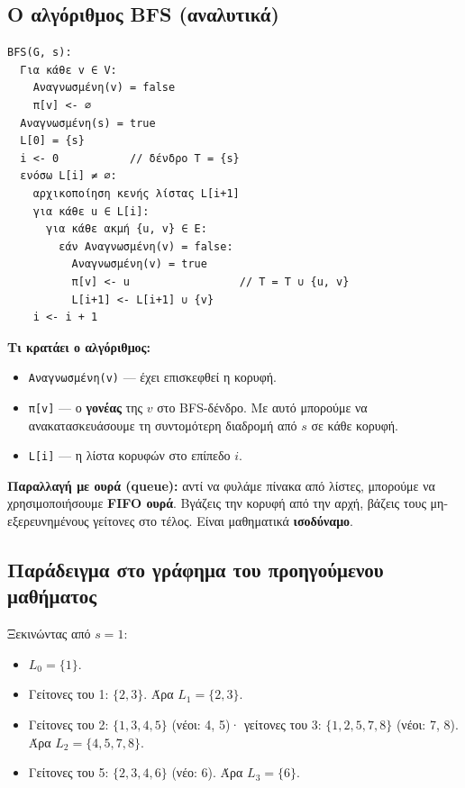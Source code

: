 \documentclass[11pt,a4paper]{article}
\begin{document}
\subsection{Ο αλγόριθμος BFS (αναλυτικά)}

\begin{codebox}
\begin{verbatim}
BFS(G, s):
  Για κάθε v ∈ V:
    Αναγνωσμένη(v) = false
    π[v] <- ∅
  Αναγνωσμένη(s) = true
  L[0] = {s}
  i <- 0           // δένδρο T = {s}
  ενόσω L[i] ≠ ∅:
    αρχικοποίηση κενής λίστας L[i+1]
    για κάθε u ∈ L[i]:
      για κάθε ακμή {u, v} ∈ E:
        εάν Αναγνωσμένη(v) = false:
          Αναγνωσμένη(v) = true
          π[v] <- u                 // T = T ∪ {u, v}
          L[i+1] <- L[i+1] ∪ {v}
    i <- i + 1
\end{verbatim}
\end{codebox}

\textbf{Τι κρατάει ο αλγόριθμος:}
\begin{itemize}
  \item \texttt{Αναγνωσμένη(v)} --- έχει επισκεφθεί η κορυφή.
  \item \texttt{π[v]} --- ο \textbf{γονέας} της $v$ στο BFS-δένδρο. Με αυτό
  μπορούμε να ανακατασκευάσουμε τη συντομότερη διαδρομή από $s$ σε κάθε κορυφή.
  \item \texttt{L[i]} --- η λίστα κορυφών στο επίπεδο $i$.
\end{itemize}

\textbf{Παραλλαγή με ουρά (queue):} αντί να φυλάμε πίνακα από λίστες, μπορούμε να
χρησιμοποιήσουμε \textbf{FIFO ουρά}. Βγάζεις την κορυφή από την αρχή, βάζεις τους
μη-εξερευνημένους γείτονες στο τέλος. Είναι μαθηματικά \textbf{ισοδύναμο}.

\subsection{Παράδειγμα στο γράφημα του προηγούμενου μαθήματος}

Ξεκινώντας από $s = 1$:
\begin{itemize}
  \item $L_0 = \{1\}$.
  \item Γείτονες του 1: $\{2, 3\}$. Άρα $L_1 = \{2, 3\}$.
  \item Γείτονες του 2: $\{1, 3, 4, 5\}$ (νέοι: 4, 5)· γείτονες του 3:
  $\{1, 2, 5, 7, 8\}$ (νέοι: 7, 8). Άρα $L_2 = \{4, 5, 7, 8\}$.
  \item Γείτονες του 5: $\{2, 3, 4, 6\}$ (νέο: 6). Άρα $L_3 = \{6\}$.
\end{itemize}
\end{document}
